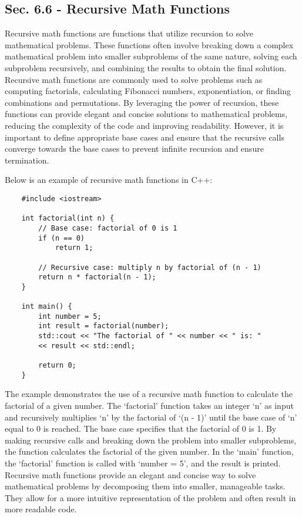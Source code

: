 \subsection*{Sec. 6.6 - Recursive Math Functions}

Recursive math functions are functions that utilize recursion to solve mathematical problems. These functions often involve breaking down a complex mathematical problem into smaller subproblems of the same nature, solving each subproblem recursively, and combining the results to obtain the final solution. Recursive math functions are commonly 
used to solve problems such as computing factorials, calculating Fibonacci numbers, exponentiation, or finding combinations and permutations. By leveraging the power of recursion, these functions can provide elegant and concise solutions to mathematical problems, reducing the complexity of the code and improving readability. However, it is 
important to define appropriate base cases and ensure that the recursive calls converge towards the base cases to prevent infinite recursion and ensure termination.

\begin{solution}
    Below is an example of recursive math functions in C++:

    \horizontalline

    \begin{verbatim}
    #include <iostream>

    int factorial(int n) {
        // Base case: factorial of 0 is 1
        if (n == 0)
            return 1;
    
        // Recursive case: multiply n by factorial of (n - 1)
        return n * factorial(n - 1);
    }
    
    int main() {
        int number = 5;
        int result = factorial(number);
        std::cout << "The factorial of " << number << " is: " 
        << result << std::endl;
    
        return 0;
    }
    \end{verbatim}

    \horizontalline

    The example demonstrates the use of a recursive math function to calculate the factorial of a given number. The `factorial' function takes an integer `n' as input and recursively multiplies `n' by the factorial of `(n - 1)' until the base case of `n' equal to 0 is reached. The base case specifies that the factorial of 0 is 1. By making recursive 
    calls and breaking down the problem into smaller subproblems, the function calculates the factorial of the given number. In the `main' function, the `factorial' function is called with `number = 5', and the result is printed. Recursive math functions provide an elegant and concise way to solve mathematical problems by decomposing them into smaller, 
    manageable tasks. They allow for a more intuitive representation of the problem and often result in more readable code.
\end{solution}

